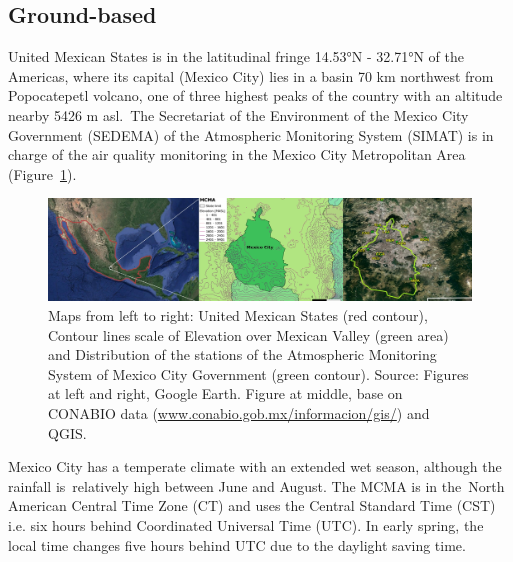 \documentclass[10pt]{article}
\begin{document}
\subsection*{Ground-based~}

{\label{339070}}

United Mexican States is in the latitudinal fringe 14.53°N - 32.71°N of
the Americas, where its capital (Mexico City) lies in a basin 70 km
northwest from Popocatepetl volcano, one of three highest peaks of the
country with an altitude nearby 5426 m asl.~The Secretariat of the
Environment of the Mexico City Government (SEDEMA) of the Atmospheric
Monitoring System (SIMAT) is in charge of the air quality monitoring in
the Mexico City Metropolitan Area
(Figure~{\ref{547698}}).~~
\begin{figure}[H]
\begin{center}
\includegraphics[width=0.84\columnwidth]{cdmx}
\caption{{Maps from left to right: United Mexican States (red contour), Contour
lines scale of Elevation over Mexican Valley (green area) and
Distribution of the stations of the Atmospheric Monitoring System of
Mexico City Government (green contour). Source: Figures at left and
right, Google Earth. Figure at middle, base on CONABIO data
(\href{http://www.conabio.gob.mx/informacion/gis/}{www.conabio.gob.mx/informacion/gis/})
and QGIS.
{\label{547698}}%
}}
\end{center}
\end{figure}

Mexico City has a temperate climate with an extended wet season,
although the rainfall is~relatively high between June and August. The
MCMA is in the~North American Central Time Zone (CT) and uses the
Central Standard Time (CST) i.e. six hours behind Coordinated Universal
Time (UTC). In early spring, the local time changes five hours behind
UTC due to the daylight saving time.
\end{document}
